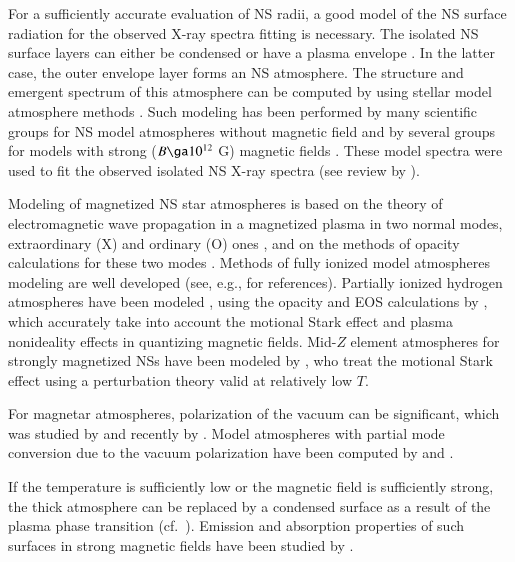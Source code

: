 \documentclass{aa}
\begin{document}
For a sufficiently accurate evaluation of NS radii, 
a good model of the NS surface radiation for 
the observed X-ray spectra fitting is necessary. The isolated NS surface 
layers can either be condensed or have a plasma envelope \citep{Lai.Salpeter:97, 
Lai:01}.  In the latter case, the outer envelope layer forms an NS 
atmosphere. The structure and emergent spectrum of this atmosphere can be 
computed by using stellar model atmosphere methods \citep[e.g.\ 
][]{Mihalas:78}.  Such modeling has been performed by many scientific 
groups for NS model 
atmospheres without magnetic field \citep{Romani:87,Zavlinetal:96, 
Rajagopal.Romani:96, Werner:00, Gansickeetal:02, Ponsetal:02} 
and by several groups 
for models with strong ($B \ga 10^{12}$ G) magnetic fields 
\citep{Shibanovetal:92, Rajagopaletal:97, Ozel:01, Ho.Lai:01, Ho.Lai:03, 
Ho.Lai:04,vAL:06}. 
These model spectra were used to fit the observed isolated 
 NS X-ray spectra (see review by \citealt{Zavlin:09}). 
 
Modeling of magnetized NS star atmospheres is 
based on the theory of electromagnetic wave propagation 
in a magnetized plasma in two normal modes, extraordinary (X) and ordinary (O) ones 
\citep{Ginzburg:70, Mezharos:92}, and on the methods of opacity calculations for these 
two modes \citep{Ventura:79, Kaminkeretal:82, Kaminkeretal:83}.  
Methods of fully 
ionized model atmospheres  modeling are well 
developed (see, e.g., \citealt{Zavlin:09} 
for references). Partially ionized hydrogen 
atmospheres have been modeled 
\citep{Potekhinetal:04, Ho.Lai:04, Hoetal:08}, 
using the opacity and EOS calculations 
by \cite{PCh:03,PCh:04}, 
which accurately take into account the motional Stark effect 
and plasma nonideality effects in quantizing magnetic fields.  
Mid-$Z$ element atmospheres for strongly 
magnetized NSs have been modeled by 
\citet{MH:07}, who treat the 
motional Stark effect using a perturbation 
theory \citep{PM:93} valid at relatively low $T$. 
 
For magnetar atmospheres, 
polarization of the vacuum can be significant, which was 
studied by \citet{PG:84} and recently by \cite{Lai.Ho:02, Lai.Ho:03}. 
Model atmospheres 
with partial mode conversion due to the vacuum 
polarization have been computed 
by \citet{Ho.Lai:03} 
and \citet{vAL:06}. 
 
If the temperature is sufficiently  low or the magnetic field is
sufficiently strong, the thick atmosphere 
can be replaced by a condensed surface 
 \citep{Lai.Salpeter:97,Lai:01,M07} 
as a result of the plasma phase transition (cf.~\citealt{PCS:99,PCh:04}). 
Emission and absorption properties of such surfaces in 
strong magnetic fields have been studied by \citet{TZD:04,vAetal:05,PAMP05}. 
 
\end{document}
